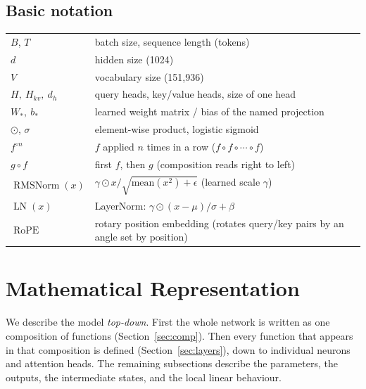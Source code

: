 \documentclass[10pt,a4paper]{article}
\newcommand{\op}[1]{\operatorname{#1}}
\theoremstyle{definition}
\begin{document}
\subsection*{Basic notation}
\begin{tabular}{ll}
\toprule
$B$, $T$ & batch size, sequence length (tokens) \\
$d$ & hidden size (1024) \\
$V$ & vocabulary size (151,936) \\
$H,\ H_{kv},\ d_h$ & query heads, key/value heads, size of one head \\
$W_\ast,\ b_\ast$ & learned weight matrix / bias of the named projection \\
$\odot$, $\sigma$ & element-wise product, logistic sigmoid \\
$f^{\circ n}$ & $f$ applied $n$ times in a row ($f\circ f\circ\cdots\circ f$) \\
$g \circ f$ & first $f$, then $g$ (composition reads right to left) \\
$\op{RMSNorm}(x)$ & $\gamma \odot x / \sqrt{\mathrm{mean}(x^2)+\epsilon}$ (learned scale $\gamma$) \\
$\op{LN}(x)$ & LayerNorm: $\gamma\odot(x-\mu)/\sigma + \beta$ \\
$\op{RoPE}$ & rotary position embedding (rotates query/key pairs by an angle set by position) \\
\bottomrule
\end{tabular}
\section{Mathematical Representation}\label{sec:func}
We describe the model \emph{top-down}. First the whole network is written as one composition of functions (Section~\ref{sec:comp}). Then every function that appears in that composition is defined (Section~\ref{sec:layers}), down to individual neurons and attention heads. The remaining subsections describe the parameters, the outputs, the intermediate states, and the local linear behaviour.
\end{document}
